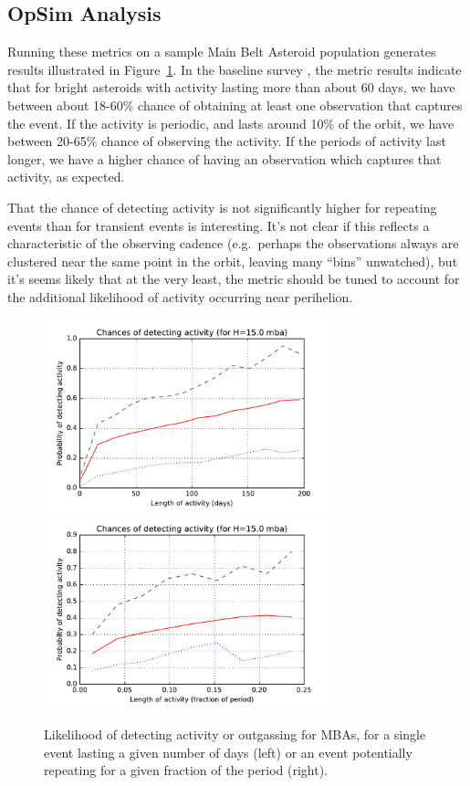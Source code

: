 
\subsection{OpSim Analysis}
\label{sec:\secname:analysis}

Running these metrics on a sample Main Belt Asteroid population
generates results illustrated in Figure~\ref{activity}.
In the baseline survey , the metric results
indicate that for bright asteroids with activity lasting more than
about 60 days, we have between about 18-60\% chance of obtaining at
least one observation that captures the event. If the activity is
periodic, and lasts around 10\% of the orbit, we have between
20-65\% chance of observing the activity. If the periods of activity
last longer, we have a higher chance of having an observation which
captures that activity, as expected.

That the chance of detecting activity is not significantly higher for
repeating events than for transient events is interesting. It's not
clear if this reflects a characteristic of the observing cadence
(e.g.\ perhaps the observations always are clustered near the same
point in the orbit, leaving many ``bins'' unwatched), but it's seems
likely that at  the very least, the metric should be tuned to account for the additional
likelihood of activity occurring near perihelion.

\begin{figure}
\includegraphics[width=3.3in]{figs/solarsystem/minion_1016_mba_Activity_time}
\includegraphics[width=3.3in]{figs/solarsystem/minion_1016_mba_Activity_period}
\caption{Likelihood of detecting activity or outgassing for MBAs, for
  a single event lasting a given number of days (left) or an event
  potentially repeating for a given fraction of the period (right).
\label{activity}}
\end{figure}


